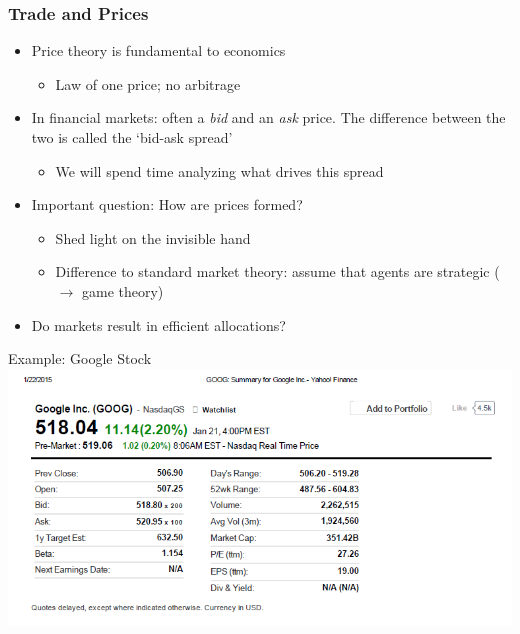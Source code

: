 \documentclass[english,10pt]{beamer}
\theoremstyle{definition}
\begin{document}
\begin{frame}[label=main2]
\frametitle{Trade and Prices}
\begin{itemize}
	\item Price theory is fundamental to economics
	\begin{itemize}
		\item Law of one price; no arbitrage
	\end{itemize}
	\item In financial markets: often a \textit{bid} and an \textit{ask} price. The difference between the two is called the `bid-ask spread' \hyperlink{bidask}{}
	\begin{itemize}
		\item We will spend time analyzing what drives this spread
	\end{itemize}
	\item Important question: How are prices formed?
	\begin{itemize}
		\item Shed light on the invisible hand
		\item Difference to standard market theory: assume that agents are strategic ($\rightarrow$ game theory) 
	\end{itemize}
	\item Do markets result in efficient allocations?
\end{itemize}
\end{frame}


\begin{frame}{Example: Google Stock}
\includegraphics[width=1\linewidth]{pics/StockSummary_Google}
\end{frame}
\end{document}
